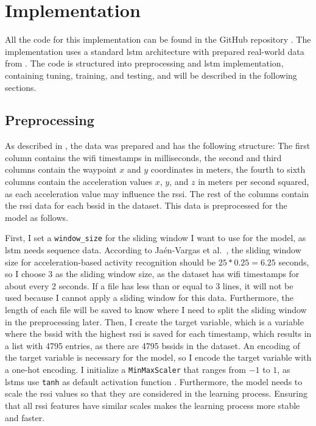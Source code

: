 \chapter{Implementation}\label{ch:implementation}

All the code for this implementation can be found in the GitHub repository \cite{github-repo}.
The implementation uses a standard \ac{lstm} architecture with prepared real-world data from .
The code is structured into preprocessing and \ac{lstm} implementation, containing tuning, training, and testing, and will be described in the following sections.

\section{Preprocessing}
As described in , the data was prepared and has the following structure:
The first column contains the \ac{wifi} timestamps in milliseconds, the second and third columns contain the waypoint $x$ and $y$ coordinates in meters, the fourth to sixth columns contain the acceleration values $x$, $y$, and $z$ in meters per second squared, as each acceleration value may influence the \ac{rssi}. %
The rest of the columns contain the \ac{rssi} data for each \ac{bssid} in the dataset.
This data is preprocessed for the model as follows.

First, I set a \texttt{window\_size} for the sliding window I want to use for the model, as \ac{lstm} needs sequence data.
According to Ja{\'e}n-Vargas et al.~\cite{EffectsSlidingWindow2022}, the sliding window size for acceleration-based activity recognition should be \(25 * 0.25 = 6.25\) seconds, so I choose \(3\) as the sliding window size, as the dataset has \ac{wifi} timestamps for about every 2 seconds. %
If a file has less than or equal to \(3\) lines, it will not be used because I cannot apply a sliding window for this data.
Furthermore, the length of each file will be saved to know where I need to split the sliding window in the preprocessing later.
Then, I create the target variable, which is a variable where the \ac{bssid} with the highest \ac{rssi} is saved for each timestamp, which results in a list with 4795 entries, as there are 4795 \acp{bssid} in the dataset.
An encoding of the target variable is necessary for the model, so I encode the target variable with a one-hot encoding.
I initialize a \texttt{MinMaxScaler} that ranges from \(-1\) to \(1\), as \acp{lstm} use \texttt{tanh} as default activation function \cite{tanh-lstm-default}.
Furthermore, the model needs to scale the \ac{rssi} values so that they are considered in the learning process.
Ensuring that all \ac{rssi} features have similar scales makes the learning process more stable and faster. 

